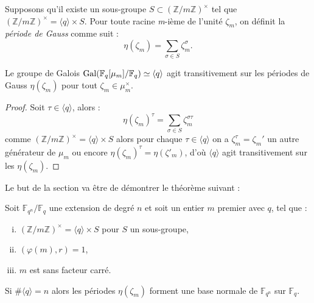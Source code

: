 \documentclass[a4paper]{article} %
\numberwithin{section}{part}
\numberwithin{equation}{section}
\newcommand\nroot[1]{\textit{#1}-ième}
\newcommand\zmodninv[1]{(\mathbb{Z}/#1\mathbb{Z})^{\times}}
\newcommand\GF[1]{\mathbb{F}_{#1}}
\newcommand\etmath{\textup{\quad et \quad}}
\newcommand\groupgen[1]{\langle{#1}\rangle}
\begin{document}
\iffalse
\begin{equation}
\#G/\groupgen{q}=g\etmath\#\groupgen{q} = f = [K[\mu_m]:K]/g.
\end{equation}
\fi

\begin{defn}
Supposons qu'il existe un sous-groupe $S\subset\zmodninv{m}$ tel que
$\zmodninv{m} = \groupgen{q}\times S$. Pour toute racine \nroot{m} de
l'unité $\zeta_m$, on définit la \emph{période de Gauss} comme suit :
\begin{equation}
\eta(\zeta_m) = \sum_{\sigma\in S}{\zeta_m^{\sigma}}.
\end{equation}
\end{defn}
\begin{prop}
\label{prop:gaussperconj}
Le groupe de Galois $\textup{Gal}(\GF{q}[\mu_m]/\GF{q})\simeq\groupgen{q}$
agit transitivement sur les périodes de Gauss $\eta(\zeta_m)$ pour tout
$\zeta_m\in\mu_m^{\times}$.
\end{prop}
\begin{proof}
Soit $\tau\in\groupgen{q}$, alors :
\begin{equation}
\eta(\zeta_m)^{\tau} = \sum_{\sigma\in S}{\zeta_m^{\sigma\tau}}
\end{equation}
comme $\zmodninv{m} = \groupgen{q}\times S$ alors pour chaque
$\tau\in\groupgen{q}$ on a $\zeta_m^{\tau} = \zeta_m'$ un autre générateur
de $\mu_m$ ou encore $\eta(\zeta_m)^{\tau} = \eta(\zeta'_m)$, d'où
$\groupgen{q}$ agit transitivement sur les $\eta(\zeta_m)$.
\end{proof}
Le but de la section va être de démontrer le théorème suivant :

\begin{thm}
\label{th:gausspernorm}
Soit $\GF{q^n}/\GF{q}$ une extension de degré $n$ et soit un entier $m$ premier 
avec $q$, tel que :
\vspace{0.3cm}
\begin{enumerate}[(i)]
    \item $\zmodninv{m} = \groupgen{q}\times S$ pour $S$ un sous-groupe,
    \item $(\varphi(m), r) = 1$,
    \item $m$ est sans facteur carré.
\end{enumerate}
\vspace{0.3cm}
Si $\#\groupgen{q} = n$ alors les périodes $\eta(\zeta_m)$ forment une base
normale de $\GF{q^n}$ sur $\GF{q}$.
\end{thm}
\end{document}
